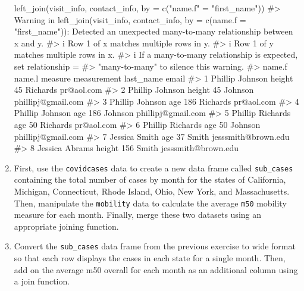 \documentclass[
  letterpaper,
]{latex/krantz}
\makeatletter
\newenvironment{Shaded}{\begin{snugshade}}{\end{snugshade}}
\newcommand{\AttributeTok}[1]{\textcolor[rgb]{0.40,0.45,0.13}{#1}}
\newcommand{\CommentTok}[1]{\textcolor[rgb]{0.37,0.37,0.37}{#1}}
\newcommand{\FunctionTok}[1]{\textcolor[rgb]{0.28,0.35,0.67}{#1}}
\newcommand{\NormalTok}[1]{\textcolor[rgb]{0.00,0.23,0.31}{#1}}
\newcommand{\OtherTok}[1]{\textcolor[rgb]{0.00,0.23,0.31}{#1}}
\newcommand{\StringTok}[1]{\textcolor[rgb]{0.13,0.47,0.30}{#1}}
\newenvironment{kframe}{%
\medskip{}
\setlength{\fboxsep}{.8em}
 \def\at@end@of@kframe{}%
 \ifinner\ifhmode%
  \def\at@end@of@kframe{\end{minipage}}%
  \begin{minipage}{\columnwidth}%
 \fi\fi%
 \def\FrameCommand##1{\hskip\@totalleftmargin \hskip-\fboxsep
 \colorbox{shadecolor}{##1}\hskip-\fboxsep
     \hskip-\linewidth \hskip-\@totalleftmargin \hskip\columnwidth}%
 \MakeFramed {\advance\hsize-\width
   \@totalleftmargin\z@ \linewidth\hsize
   \@setminipage}}%
 {\par\unskip\endMakeFramed%
 \at@end@of@kframe}
\renewenvironment{Shaded}{\begin{kframe}}{\end{kframe}}
\makeatother
\begin{document}
\begin{enumerate}
\begin{Shaded}
\begin{Highlighting}[]
\FunctionTok{left\_join}\NormalTok{(visit\_info, contact\_info, }
          \AttributeTok{by =} \FunctionTok{c}\NormalTok{(}\StringTok{"name.f"} \OtherTok{=} \StringTok{"first\_name"}\NormalTok{))}
\CommentTok{\#\textgreater{} Warning in left\_join(visit\_info, contact\_info, by = c(name.f = "first\_name")): Detected an unexpected many{-}to{-}many relationship between \textasciigrave{}x\textasciigrave{} and \textasciigrave{}y\textasciigrave{}.}
\CommentTok{\#\textgreater{} i Row 1 of \textasciigrave{}x\textasciigrave{} matches multiple rows in \textasciigrave{}y\textasciigrave{}.}
\CommentTok{\#\textgreater{} i Row 1 of \textasciigrave{}y\textasciigrave{} matches multiple rows in \textasciigrave{}x\textasciigrave{}.}
\CommentTok{\#\textgreater{} i If a many{-}to{-}many relationship is expected, set \textasciigrave{}relationship =}
\CommentTok{\#\textgreater{}   "many{-}to{-}many"\textasciigrave{} to silence this warning.}
\CommentTok{\#\textgreater{}    name.f   name.l measure measurement last\_name               email}
\CommentTok{\#\textgreater{} 1 Phillip  Johnson  height          45  Richards          pr@aol.com}
\CommentTok{\#\textgreater{} 2 Phillip  Johnson  height          45   Johnson  phillipj@gmail.com}
\CommentTok{\#\textgreater{} 3 Phillip  Johnson     age         186  Richards          pr@aol.com}
\CommentTok{\#\textgreater{} 4 Phillip  Johnson     age         186   Johnson  phillipj@gmail.com}
\CommentTok{\#\textgreater{} 5 Phillip Richards     age          50  Richards          pr@aol.com}
\CommentTok{\#\textgreater{} 6 Phillip Richards     age          50   Johnson  phillipj@gmail.com}
\CommentTok{\#\textgreater{} 7 Jessica    Smith     age          37     Smith jesssmith@brown.edu}
\CommentTok{\#\textgreater{} 8 Jessica   Abrams  height         156     Smith jesssmith@brown.edu}
\end{Highlighting}
\end{Shaded}
\item
  First, use the \texttt{covidcases} data to create a new data frame
  called \texttt{sub\_cases} containing the total number of cases by
  month for the states of California, Michigan, Connecticut, Rhode
  Island, Ohio, New York, and Massachusetts. Then, manipulate the
  \texttt{mobility} data to calculate the average \texttt{m50} mobility
  measure for each month. Finally, merge these two datasets using an
  appropriate joining function.
\item
  Convert the \texttt{sub\_cases} data frame from the previous exercise
  to wide format so that each row displays the cases in each state for a
  single month. Then, add on the average m50 overall for each month as
  an additional column using a join function.
\end{enumerate}
\end{document}

